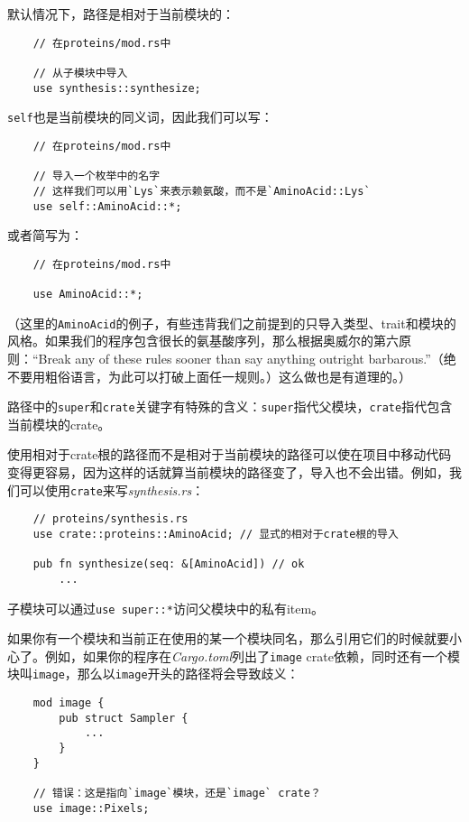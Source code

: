 默认情况下，路径是相对于当前模块的：
\begin{verbatim}
    // 在proteins/mod.rs中

    // 从子模块中导入
    use synthesis::synthesize;
\end{verbatim}

\texttt{self}也是当前模块的同义词，因此我们可以写：
\begin{verbatim}
    // 在proteins/mod.rs中

    // 导入一个枚举中的名字
    // 这样我们可以用`Lys`来表示赖氨酸，而不是`AminoAcid::Lys`
    use self::AminoAcid::*;
\end{verbatim}

或者简写为：
\begin{verbatim}
    // 在proteins/mod.rs中

    use AminoAcid::*;
\end{verbatim}

（这里的\texttt{AminoAcid}的例子，有些违背我们之前提到的只导入类型、trait和模块的风格。如果我们的程序包含很长的氨基酸序列，那么根据奥威尔的第六原则：“Break any of these rules sooner than say anything outright barbarous.”（绝不要用粗俗语言，为此可以打破上面任一规则。）这么做也是有道理的。）

路径中的\texttt{super}和\texttt{crate}关键字有特殊的含义：\texttt{super}指代父模块，\texttt{crate}指代包含当前模块的crate。

使用相对于crate根的路径而不是相对于当前模块的路径可以使在项目中移动代码变得更容易，因为这样的话就算当前模块的路径变了，导入也不会出错。例如，我们可以使用\texttt{crate}来写\emph{synthesis.rs}：
\begin{verbatim}
    // proteins/synthesis.rs
    use crate::proteins::AminoAcid; // 显式的相对于crate根的导入

    pub fn synthesize(seq: &[AminoAcid]) // ok
        ...
\end{verbatim}

子模块可以通过\texttt{use super::*}访问父模块中的私有item。

如果你有一个模块和当前正在使用的某一个模块同名，那么引用它们的时候就要小心了。例如，如果你的程序在\emph{Cargo.toml}列出了\texttt{image} crate依赖，同时还有一个模块叫\texttt{image}，那么以\texttt{image}开头的路径将会导致歧义：
\begin{verbatim}
    mod image {
        pub struct Sampler {
            ...
        }
    }

    // 错误：这是指向`image`模块，还是`image` crate？
    use image::Pixels;
\end{verbatim}

